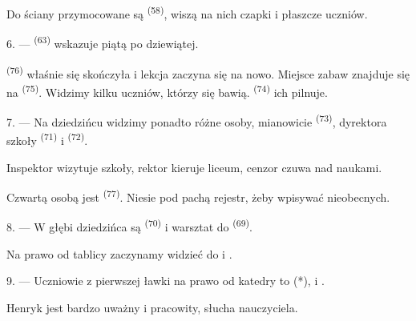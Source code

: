 Do ściany przymocowane są  \textsuperscript{(58)}, wiszą na nich
czapki i płaszcze uczniów.

\VUsaut{5.2mm}
\VUsaut{3.6mm}

6. ---  \textsuperscript{(63)} wskazuje piątą po dziewiątej.

 \textsuperscript{(76)} właśnie się skończyła i lekcja zaczyna się
na nowo. Miejsce zabaw znajduje się na  \textsuperscript{(75)}.
Widzimy kilku uczniów, którzy się bawią. 
\textsuperscript{(74)} ich pilnuje.

7. --- Na dziedzińcu widzimy ponadto różne osoby, mianowicie
 \textsuperscript{(73)}, dyrektora szkoły 
\textsuperscript{(71)} i  \textsuperscript{(72)}.

Inspektor wizytuje szkoły, rektor kieruje liceum, cenzor czuwa nad naukami.

Czwartą osobą jest  \textsuperscript{(77)}. Niesie pod pachą rejestr,
żeby wpisywać nieobecnych.

8. --- W głębi dziedzińca są  \textsuperscript{(70)} i
warsztat do  \textsuperscript{(69)}.

Na prawo od tablicy zaczynamy widzieć  do  i
.


\VUsaut{2.4mm}

\VUsaut{3.0mm}

9. --- Uczniowie z pierwszej ławki na prawo od katedry to  (*),
 i .

Henryk jest bardzo uważny i pracowity, słucha nauczyciela.

